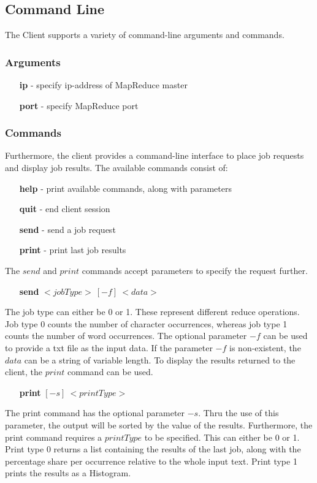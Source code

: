 \documentclass[12pt, letterpaper]{article}
\begin{document}
\pagebreak
\subsection{Command Line}
The Client supports a variety of command-line arguments and commands.

\subsubsection{Arguments} 
\begin{itemize}
	\item [\textbf{ip}] - specify ip-address of MapReduce master 
	\item [\textbf{port}] - specify MapReduce port
\end{itemize} 

\subsubsection{Commands}
Furthermore, the client provides a command-line interface to place job requests and display job results. The available commands consist of:

\begin{itemize}
	\item [\textbf{help}] - print available commands, along with parameters
	\item [\textbf{quit}] - end client session
	\item [\textbf{send}] - send a job request
	\item [\textbf{print}] - print last job results
\end{itemize}

The $send$ and $print$ commands accept parameters to specify the request further.

\begin{itemize}
	\item [\textbf{send}] $<jobType>\ [-f]\ <data>$
\end{itemize} 

The job type can either be 0 or 1. These represent different reduce operations.
Job type 0 counts the number of character occurrences, whereas job type 1 counts the number of word occurrences. The optional parameter $-f$ can be used to provide a txt file as the input data. If the parameter $-f$ is non-existent, the $data$ can be a string of variable length.\newline
To display the results returned to the client, the $print$ command can be used.
\begin{itemize}
	\item [\textbf{print}] $[-s]\ <printType>$
\end{itemize}  
The print command has the optional parameter $-s$. Thru the use of this parameter, the output will be sorted by the value of the results. Furthermore, the print command requires a $printType$ to be specified. This can either be 0 or 1. Print type 0 returns a list containing the results of the last job, along with the percentage share per occurrence relative to the whole input text. Print type 1 prints the results as a Histogram. 
\end{document}
